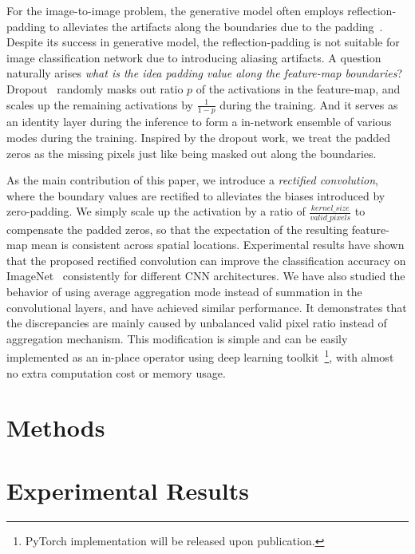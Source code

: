 \documentclass{article}
\begin{document}
For the image-to-image problem, the generative model often employs reflection-padding to alleviates the artifacts along the boundaries due to the padding~\cite{zhang2017multistyle}. 
Despite its success in generative model, the reflection-padding is not suitable for image classification network due to introducing aliasing artifacts. 
A question naturally arises {\it what is the idea padding value along the feature-map boundaries}? Dropout~\cite{srivastava2014dropout} randomly masks out ratio $p$ of the activations in the feature-map, and scales up the remaining activations by $\frac{1}{1-p}$ during the training. 
And it serves as an identity layer during the inference to form a in-network ensemble of various modes during the training. Inspired by the dropout work, we treat the padded zeros as the missing pixels just like being masked out along the boundaries. 






As the main contribution of this paper, we introduce a {\it rectified convolution}, where the boundary values are rectified to alleviates the biases introduced by zero-padding. 
We simply scale up the activation by a ratio of $\frac{kernel\_size}{valid\_pixels}$ to compensate the padded zeros, so that the expectation of the resulting feature-map mean is consistent across spatial locations. 
Experimental results have shown that the proposed rectified convolution can improve the classification accuracy on ImageNet~\cite{imagenet} consistently for different CNN architectures. 
We have also studied the behavior of using average aggregation mode instead of summation in the convolutional layers, and have achieved similar performance. 
It demonstrates that the discrepancies are mainly caused by unbalanced valid pixel ratio instead of aggregation mechanism. 
This modification is simple and can be easily implemented as an in-place operator using deep learning toolkit~\footnote{PyTorch implementation will be released upon publication.}, with almost no extra computation cost or memory usage.


\section{Methods}



\section{Experimental Results}
\end{document}
